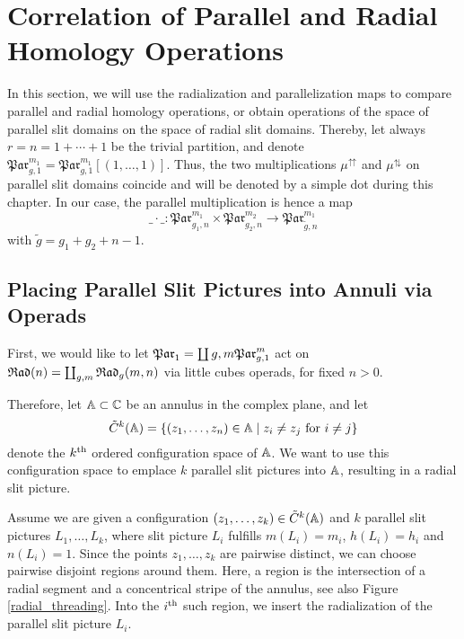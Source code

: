 \section{Correlation of Parallel and Radial Homology Operations}
\label{homology_operations:comparision_of_par_and_rad}

In this section, we will use the radialization and parallelization maps to compare parallel and radial homology operations,
or obtain operations of the space of parallel slit domains on the space of radial slit domains.
Thereby, let always $r = n = 1 + \dotsb + 1$ be the trivial partition, and denote $\mathfrak{Par}_{g, 1}^{m_1} = \mathfrak{Par}_{g, 1}^{m_1}[(1, \dotsc, 1)]$.
Thus, the two multiplications $\mu^{\upuparrows}$ and $\mu^{\updownarrows}$ on parallel slit domains coincide 
and will be denoted by a simple dot during this chapter.
In our case, the parallel multiplication is hence a map
\[
   \_\cdot\_ \colon \mathfrak{Par}_{g_1, n}^{m_1} \times \mathfrak{Par}_{g_2, n}^{m_2} \to \mathfrak{Par}_{\tilde g, n}^{m_1} 
\]
with $\tilde g = g_1 + g_2 + n - 1$.

\subsection{Placing Parallel Slit Pictures into Annuli via Operads}
\label{par_into_annulus}

First, we would like to let $\mathfrak{Par}_1 = \coprod{g, m} \mathfrak{Par}_{g, 1}^m$ act on $\mathfrak{Rad}(n) = \coprod_{g, m} {\mathfrak{Rad}_g(m,n)}$ via little cubes operads, for fixed $n > 0$.

Therefore, let $\mathbb A \subset \mathbb C$ be an annulus in the complex plane, 
and let
\label{conf_space_annuli}
\[
   \tilde C^k(\mathbb A) = \{(z_1, \dotsc, z_n) \in \mathbb A \mid z_i \neq z_j \text{ for } i \neq j\}
\]
denote the $k^{\text{th}}$ ordered configuration space of $\mathbb A$. 
We want to use this configuration space to emplace $k$ parallel slit pictures into $\mathbb A$,
resulting in a radial slit picture.

Assume we are given a configuration $(z_1, \dotsc, z_k) \in \tilde C^k(\mathbb A)$ and $k$ parallel slit pictures $L_1, \dotsc, L_k$,
where slit picture $L_i$ fulfills $m(L_i) = m_i$, $h(L_i) = h_i$ and $n(L_i) = 1$.
Since the points $z_1, \dotsc, z_k$ are pairwise distinct, we can choose pairwise disjoint regions around them.
Here, a region is the intersection of a radial segment and a concentrical stripe of the annulus, see also Figure \ref{radial_threading}.
Into the $i^{\text{th}}$ such region, we insert the radialization of the parallel slit picture $L_i$.

